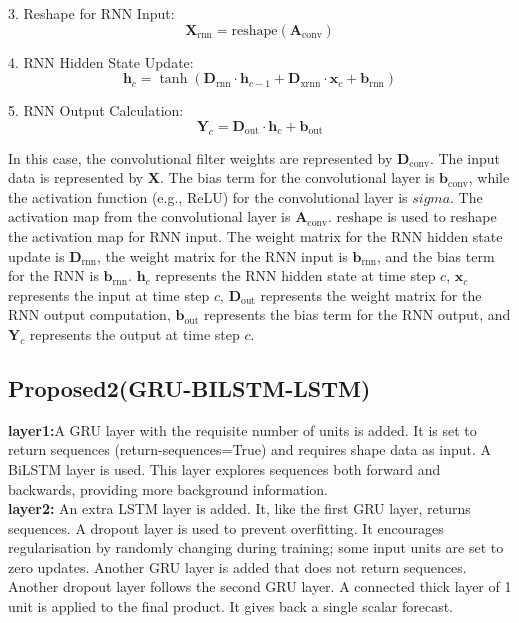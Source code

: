 \documentclass[a4paper,fleqn]{cas-sc}
\begin{document}
3. Reshape for RNN Input:
\begin{equation}
\mathbf{X}_{\text{rnn}} = \text{reshape}(\mathbf{A}_{\text{conv}})
\end{equation}

4. RNN Hidden State Update:
\begin{equation}
\mathbf{h}_c = \tanh(\mathbf{D}_{\text{rnn}} \cdot \mathbf{h}_{c-1} + \mathbf{D}_{\text{xrnn}} \cdot \mathbf{x}_c + \mathbf{b}_{\text{rnn}})
\end{equation}

5. RNN Output Calculation:
\begin{equation}
\mathbf{Y}_c = \mathbf{D}_{\text{out}} \cdot \mathbf{h}_c + \mathbf{b}_{\text{out}}
\end{equation}

In this case, the convolutional filter weights are represented by $\mathbf{D}_\text{conv}$. The input data is represented by $\mathbf{X}$. The bias term for the convolutional layer is $\mathbf{b}_\text{conv}$, while the activation function (e.g., ReLU) for the convolutional layer is $sigma$. The activation map from the convolutional layer is $\mathbf{A}_\text{conv}$. $\text{reshape}$ is used to reshape the activation map for RNN input. The weight matrix for the RNN hidden state update is $\mathbf{D}_\text{rnn}$, the weight matrix for the RNN input is $\mathbf{b}_\text{rnn}$, and the bias term for the RNN is $\mathbf{b}_\text{rnn}$. $\mathbf{h}_c$ represents the RNN hidden state at time step $c$, $\mathbf{x}_c$ represents the input at time step $c$, $\mathbf{D}_\text{out}$ represents the weight matrix for the RNN output computation, $\mathbf{b}_\text{out}$ represents the bias term for the RNN output, and $\mathbf{Y}_c$ represents the output at time step $c$.



\subsection{Proposed2(GRU-BILSTM-LSTM)}
\textbf{layer1:}A GRU layer with the requisite number of units is added. It is set to return sequences (return-sequences=True) and requires shape data as input.
A BiLSTM layer is used. This layer explores sequences both forward and backwards, providing more background information.\\
\textbf{layer2:} An extra LSTM layer is added. It, like the first GRU layer, returns sequences. A dropout layer is used to prevent overfitting. It encourages regularisation by randomly changing during training; some input units are set to zero updates. Another GRU layer is added that does not return sequences.
Another dropout layer follows the second GRU layer. A connected thick layer of 1 unit is applied to the final product. It gives back a single scalar forecast.
\end{document}
